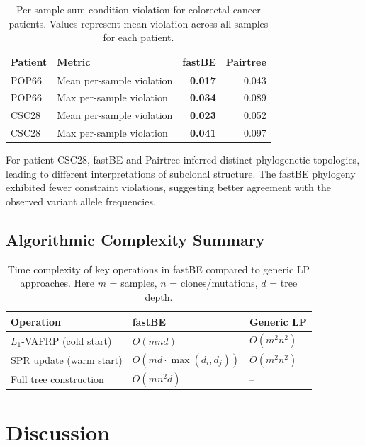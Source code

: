 \documentclass[11pt]{article}
\begin{document}
\begin{table}[H]
\centering
\caption{Per-sample sum-condition violation for colorectal cancer patients. Values represent mean violation across all samples for each patient.}
\label{tab:crc}
\begin{tabular}{llrr}
\toprule
\textbf{Patient} & \textbf{Metric} & \textbf{fastBE} & \textbf{Pairtree} \\
\midrule
POP66 & Mean per-sample violation & \textbf{0.017} & 0.043 \\
POP66 & Max per-sample violation & \textbf{0.034} & 0.089 \\
CSC28 & Mean per-sample violation & \textbf{0.023} & 0.052 \\
CSC28 & Max per-sample violation & \textbf{0.041} & 0.097 \\
\bottomrule
\end{tabular}
\end{table}

For patient CSC28, fastBE and Pairtree inferred distinct phylogenetic topologies, leading to different interpretations of subclonal structure. The fastBE phylogeny exhibited fewer constraint violations, suggesting better agreement with the observed variant allele frequencies.

\subsection{Algorithmic Complexity Summary}

\begin{table}[H]
\centering
\caption{Time complexity of key operations in fastBE compared to generic LP approaches. Here $m$ = samples, $n$ = clones/mutations, $d$ = tree depth.}
\label{tab:complexity}
\begin{tabular}{lll}
\toprule
\textbf{Operation} & \textbf{fastBE} & \textbf{Generic LP} \\
\midrule
$L_1$-VAFRP (cold start) & $O(mnd)$ & $O(m^2n^2)$ \\
SPR update (warm start) & $O(md \cdot \max(d_i, d_j))$ & $O(m^2n^2)$ \\
Full tree construction & $O(mn^2d)$ & -- \\
\bottomrule
\end{tabular}
\end{table}

\section{Discussion}
\end{document}
